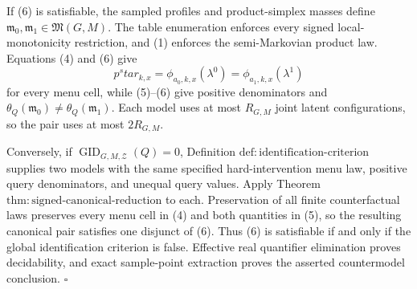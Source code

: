 If (6) is satisfiable, the sampled profiles and product-simplex masses define \(\mathfrak m_0,\mathfrak m_1\in\mathfrak M(G,M)\).  The table enumeration enforces every signed local-monotonicity restriction, and (1) enforces the semi-Markovian product law.  Equations (4) and (6) give
\[
 p^star_{k,x}
 =\phi_{a_0,k,x}(\lambda^0)
 =\phi_{a_1,k,x}(\lambda^1)
\]
for every menu cell, while (5)--(6) give positive denominators and
\(
 \theta_Q(\mathfrak m_0)\ne\theta_Q(\mathfrak m_1)
\).
Each model uses at most \(R_{G,M}\) joint latent configurations, so the pair uses at most \(2R_{G,M}\).

Conversely, if \(\operatorname{GID}_{G,M,\mathcal Z}(Q)=0\), Definition \(\mathrm{def:identification\text{-}criterion}\) supplies two models with the same specified hard-intervention menu law, positive query denominators, and unequal query values.  Apply Theorem \(\mathrm{thm:signed\text{-}canonical\text{-}reduction}\) to each.  Preservation of all finite counterfactual laws preserves every menu cell in (4) and both quantities in (5), so the resulting canonical pair satisfies one disjunct of (6).  Thus (6) is satisfiable if and only if the global identification criterion is false.  Effective real quantifier elimination proves decidability, and exact sample-point extraction proves the asserted countermodel conclusion. \(\square\)